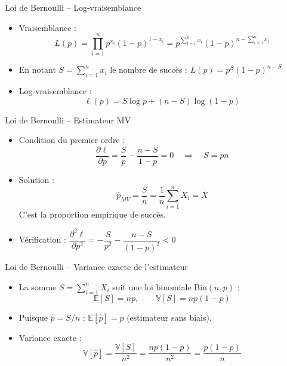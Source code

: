 \documentclass[11pt,aspectratio=169]{beamer}
\begin{document}
\begin{frame}{Loi de Bernoulli -- Log-vraisemblance}

\begin{itemize}

\item Vraisemblance :
  \[
  L(p) = \prod_{i=1}^n p^{x_i} (1-p)^{1-x_i} = p^{\sum_{i=1}^n x_i} (1-p)^{n - \sum_{i=1}^n x_i}
  \]

\item En notant $S = \sum_{i=1}^n x_i$ le nombre de succès : $L(p) = p^S (1-p)^{n-S}$\newline

\item Log-vraisemblance :
  \[
  \ell(p) = S \log p + (n - S) \log(1-p)
  \]

\end{itemize}

\end{frame}

\begin{frame}{Loi de Bernoulli -- Estimateur MV}

\begin{itemize}

\item Condition du premier ordre :
  \[
  \frac{\partial \ell}{\partial p} = \frac{S}{p} - \frac{n-S}{1-p} = 0 \quad \Rightarrow \quad S = pn
  \]

\item Solution :
  \[
  \boxed{\hat{p}_{MV} = \frac{S}{n} = \frac{1}{n}\sum_{i=1}^n X_i = \bar{X}}
  \]
  C'est la proportion empirique de succès.\newline

\item Vérification : $\dfrac{\partial^2 \ell}{\partial p^2} = -\dfrac{S}{p^2} - \dfrac{n-S}{(1-p)^2} < 0$ \checkmark

\end{itemize}

\end{frame}

\begin{frame}{Loi de Bernoulli -- Variance exacte de l'estimateur}

\begin{itemize}

\item La somme $S = \sum_{i=1}^n X_i$ suit une loi binomiale $\text{Bin}(n, p)$ :
  \[
  \mathbb{E}[S] = np, \qquad \mathbb{V}[S] = np(1-p)
  \]

\item Puisque $\hat{p} = S/n$ : $\mathbb{E}[\hat{p}] = p$ (estimateur sans biais).\newline

\item Variance exacte :
  \[
  \boxed{\mathbb{V}[\hat{p}] = \frac{\mathbb{V}[S]}{n^2} = \frac{np(1-p)}{n^2} = \frac{p(1-p)}{n}}
  \]

\end{itemize}

\end{frame}
\end{document}
